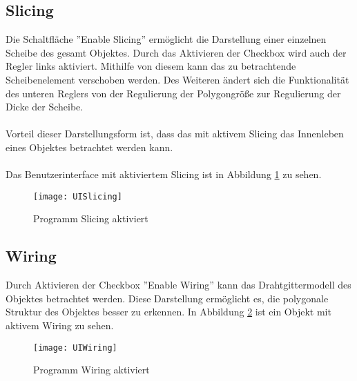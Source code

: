 \subsection{Slicing}
\label{sec:slicing}
Die Schaltfläche ''Enable Slicing'' ermöglicht die Darstellung einer einzelnen Scheibe des gesamt Objektes. Durch das Aktivieren der Checkbox wird auch der Regler links aktiviert. Mithilfe von diesem kann das zu betrachtende Scheibenelement verschoben werden. Des Weiteren ändert sich die Funktionalität des unteren Reglers von der Regulierung der Polygongröße zur Regulierung der Dicke der Scheibe.\\
\\
Vorteil dieser Darstellungsform ist, dass das mit aktivem Slicing das Innenleben eines Objektes betrachtet werden kann.\\
\\
Das Benutzerinterface mit aktiviertem Slicing ist in Abbildung \ref{fig:UISlicing} zu sehen.
\begin{figure}[H]
	\centering
	\texttt{[image: UISlicing]}
	\caption{Programm Slicing aktiviert}
	\label{fig:UISlicing}
\end{figure}
\subsection{Wiring}
\label{sec:wiring}
Durch Aktivieren der Checkbox ''Enable Wiring'' kann das Drahtgittermodell des Objektes betrachtet werden. Diese Darstellung ermöglicht es, die polygonale Struktur des Objektes besser zu erkennen. In Abbildung \ref{fig:UIWiring} ist ein Objekt mit aktivem Wiring zu sehen.
\begin{figure}[H]
	\centering
	\texttt{[image: UIWiring]}
	\caption{Programm Wiring aktiviert}
	\label{fig:UIWiring}
\end{figure}